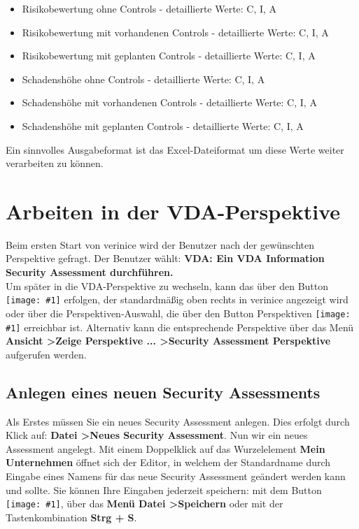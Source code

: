 \documentclass[a4paper,10pt]{book}
\newcommand{\icon}[1]{\texttt{[image: \#1]}}
\begin{document}
\begin{itemize}
\item Risikobewertung ohne Controls - detaillierte Werte: C, I, A
\item Risikobewertung mit vorhandenen Controls - detaillierte Werte: C, I, A
\item Risikobewertung mit geplanten Controls - detaillierte Werte: C,
  I, A
\item Schadenshöhe ohne Controls - detaillierte Werte: C, I, A
\item Schadenshöhe mit vorhandenen Controls - detaillierte Werte: C,
  I, A
\item Schadenshöhe mit geplanten Controls - detaillierte Werte: C, I,
  A
\end{itemize}

Ein sinnvolles Ausgabeformat ist das Excel-Dateiformat um diese Werte
weiter verarbeiten zu können.

\chapter{Arbeiten in der VDA-Perspektive} \label{Arbeiten in der VDA-Perspektive}
Beim ersten Start von verinice wird der Benutzer nach der gewünschten Perspektive gefragt.
Der Benutzer wählt: \textbf{VDA: Ein VDA Information Security Assessment durchführen.}
\newline\\
Um später in die VDA-Perspektive zu wechseln, kann das über den Button \icon{Icon/Vda-persp-btn.png} erfolgen,
der standardmäßig oben rechts in verinice angezeigt wird oder über die Perspektiven-Auswahl,
die über den Button Perspektiven \icon{Icon/New_persp.png} erreichbar ist.
Alternativ kann die entsprechende Perspektive über das Menü \textbf{Ansicht \textgreater Zeige Perspektive ... \textgreater Security Assessment Perspektive} aufgerufen werden.

\section{Anlegen eines neuen Security Assessments}
Als Erstes müssen Sie ein neues Security Assessment anlegen. Dies erfolgt durch Klick auf:
\textbf{Datei \textgreater Neues Security Assessment}. Nun wir ein neues Assessment angelegt. Mit einem Doppelklick auf das Wurzelelement
\textbf{Mein Unternehmen} öffnet sich der Editor, in welchem der Standardname durch Eingabe eines Namens für das neue Security
Assessment geändert werden kann und sollte. Sie können Ihre Eingaben jederzeit speichern: mit dem Button \icon{Icon/Disk.png},
über das \textbf{Menü Datei \textgreater Speichern} oder mit der Tastenkombination \textbf{Strg + S}.
\end{document}
